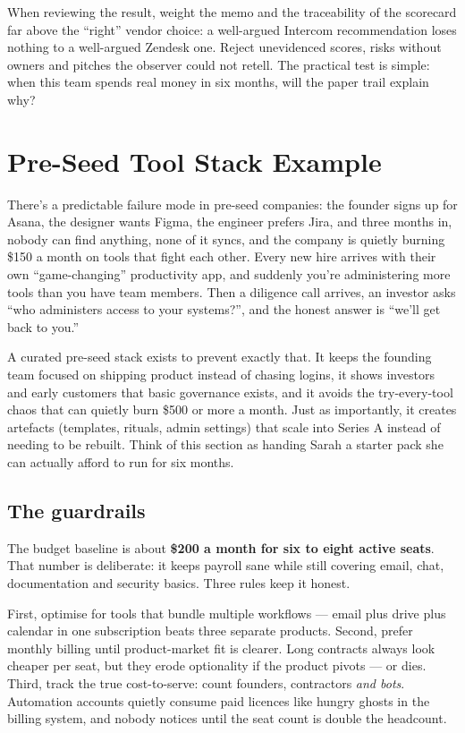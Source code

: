 When reviewing the result, weight the memo and the traceability of the scorecard far above the ``right'' vendor choice: a well-argued Intercom recommendation loses nothing to a well-argued Zendesk one. Reject unevidenced scores, risks without owners and pitches the observer could not retell. The practical test is simple: when this team spends real money in six months, will the paper trail explain why?

\section{Pre-Seed Tool Stack Example}
There's a predictable failure mode in pre-seed companies: the founder signs up for Asana, the designer wants Figma, the engineer prefers Jira, and three months in, nobody can find anything, none of it syncs, and the company is quietly burning \$150 a month on tools that fight each other. Every new hire arrives with their own ``game-changing'' productivity app, and suddenly you're administering more tools than you have team members. Then a diligence call arrives, an investor asks ``who administers access to your systems?'', and the honest answer is ``we'll get back to you.''


A curated pre-seed stack exists to prevent exactly that. It keeps the founding team focused on shipping product instead of chasing logins, it shows investors and early customers that basic governance exists, and it avoids the try-every-tool chaos that can quietly burn \$500 or more a month. Just as importantly, it creates artefacts (templates, rituals, admin settings) that scale into Series A instead of needing to be rebuilt. Think of this section as handing Sarah a starter pack she can actually afford to run for six months.



\subsection{The guardrails}


The budget baseline is about \textbf{\$200 a month for six to eight active seats}. That number is deliberate: it keeps payroll sane while still covering email, chat, documentation and security basics. Three rules keep it honest.


First, optimise for tools that bundle multiple workflows — email plus drive plus calendar in one subscription beats three separate products. Second, prefer monthly billing until product-market fit is clearer. Long contracts always look cheaper per seat, but they erode optionality if the product pivots — or dies. Third, track the true cost-to-serve: count founders, contractors \emph{and bots}. Automation accounts quietly consume paid licences like hungry ghosts in the billing system, and nobody notices until the seat count is double the headcount.



